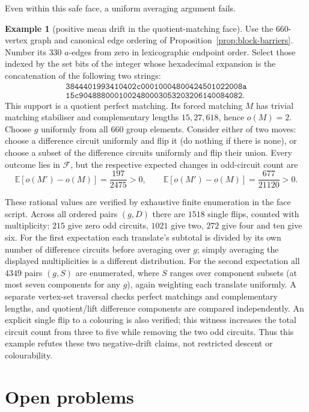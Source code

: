 \documentclass[11pt,a4paper]{article}
\theoremstyle{definition}
\newtheorem{example}[theorem]{Example}
\theoremstyle{remark}
\begin{document}
Even within this safe face, a uniform averaging argument fails.
\begin{example}[positive mean drift in the quotient-matching face]\label{ex:face-drift}
Use the $660$-vertex graph and canonical edge ordering of Proposition~\ref{prop:block-barriers}.  Number its $330$ $a$-edges from zero in lexicographic endpoint order.  Select those indexed by the set bits of the integer whose hexadecimal expansion is the concatenation of the following two strings:
\[
\begin{gathered}
\texttt{3844401993410402c00010004800424501022008a}\\
\texttt{15c9048880001002480003053203206140084082}.
\end{gathered}
\]
This support is a quotient perfect matching.  Its forced matching $M$ has trivial matching stabiliser and complementary lengths $15,27,618$, hence $o(M)=2$.  Choose $g$ uniformly from all $660$ group elements.  Consider either of two moves: choose a difference circuit uniformly and flip it (do nothing if there is none), or choose a subset of the difference circuits uniformly and flip their union.  Every outcome lies in $\mathcal F$, but the respective expected changes in odd-circuit count are
\[
 \mathbb E[o(M')-o(M)]=\frac{197}{2475}>0,
 \qquad
 \mathbb E[o(M')-o(M)]=\frac{677}{21120}>0.
\]

These rational values are verified by exhaustive finite enumeration in the face script.  Across all ordered pairs $(g,D)$ there are $1518$ single flips, counted with multiplicity: $215$ give zero odd circuits, $1021$ give two, $272$ give four and ten give six.  For the first expectation each translate's subtotal is divided by its own number of difference circuits before averaging over $g$; simply averaging the displayed multiplicities is a different distribution.  For the second expectation all $4349$ pairs $(g,S)$ are enumerated, where $S$ ranges over component subsets (at most seven components for any $g$), again weighting each translate uniformly.  A separate vertex-set traversal checks perfect matchings and complementary lengths, and quotient/lift difference components are compared independently.  An explicit single flip to a colouring is also verified; this witness increases the total circuit count from three to five while removing the two odd circuits.  Thus this example refutes these two negative-drift claims, not restricted descent or colourability.
\end{example}

\section{Open problems}\label{sec:open}
\end{document}
